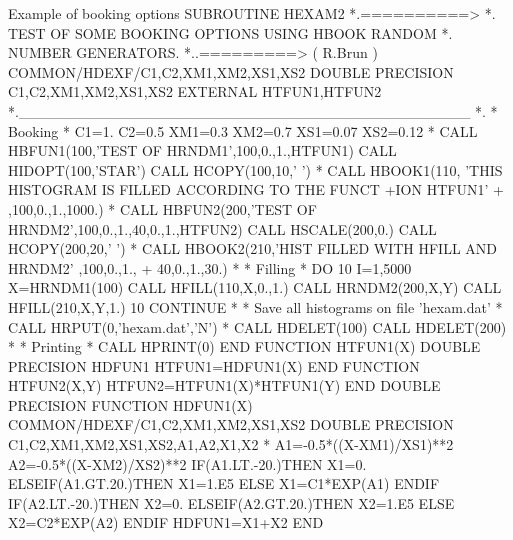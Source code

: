 \begin{XMPt}{Example of booking options}
      SUBROUTINE HEXAM2
*.==========>
*.           TEST OF SOME BOOKING OPTIONS USING HBOOK RANDOM
*.           NUMBER GENERATORS.
*..=========> ( R.Brun )
      COMMON/HDEXF/C1,C2,XM1,XM2,XS1,XS2
      DOUBLE PRECISION C1,C2,XM1,XM2,XS1,XS2
      EXTERNAL HTFUN1,HTFUN2
*.___________________________________________
*.
*             Booking
*
      C1=1.
      C2=0.5
      XM1=0.3
      XM2=0.7
      XS1=0.07
      XS2=0.12
*
      CALL HBFUN1(100,'TEST OF HRNDM1',100,0.,1.,HTFUN1)
      CALL HIDOPT(100,'STAR')
      CALL HCOPY(100,10,' ')
*
      CALL HBOOK1(110,  'THIS HISTOGRAM IS FILLED ACCORDING TO THE FUNCT
     +ION HTFUN1'
     +  ,100,0.,1.,1000.)
*
      CALL HBFUN2(200,'TEST OF HRNDM2',100,0.,1.,40,0.,1.,HTFUN2)
      CALL HSCALE(200,0.)
      CALL HCOPY(200,20,' ')
*
      CALL HBOOK2(210,'HIST FILLED WITH HFILL AND HRNDM2' ,100,0.,1.,
     +  40,0.,1.,30.)
*
*             Filling
*
      DO 10 I=1,5000
         X=HRNDM1(100)
         CALL HFILL(110,X,0.,1.)
         CALL HRNDM2(200,X,Y)
         CALL HFILL(210,X,Y,1.)
  10  CONTINUE
*
*             Save all histograms on file 'hexam.dat'
*
      CALL HRPUT(0,'hexam.dat','N')
*
      CALL HDELET(100)
      CALL HDELET(200)
*
*             Printing
*
      CALL HPRINT(0)
      END
      FUNCTION HTFUN1(X)
      DOUBLE PRECISION HDFUN1
      HTFUN1=HDFUN1(X)
      END
      FUNCTION HTFUN2(X,Y)
      HTFUN2=HTFUN1(X)*HTFUN1(Y)
      END
      DOUBLE PRECISION FUNCTION HDFUN1(X)
      COMMON/HDEXF/C1,C2,XM1,XM2,XS1,XS2
      DOUBLE PRECISION C1,C2,XM1,XM2,XS1,XS2,A1,A2,X1,X2
*
      A1=-0.5*((X-XM1)/XS1)**2
      A2=-0.5*((X-XM2)/XS2)**2
      IF(A1.LT.-20.)THEN
         X1=0.
      ELSEIF(A1.GT.20.)THEN
         X1=1.E5
      ELSE
         X1=C1*EXP(A1)
      ENDIF
      IF(A2.LT.-20.)THEN
         X2=0.
      ELSEIF(A2.GT.20.)THEN
         X2=1.E5
      ELSE
         X2=C2*EXP(A2)
      ENDIF
      HDFUN1=X1+X2
      END
\end{XMPt}
\newpage
